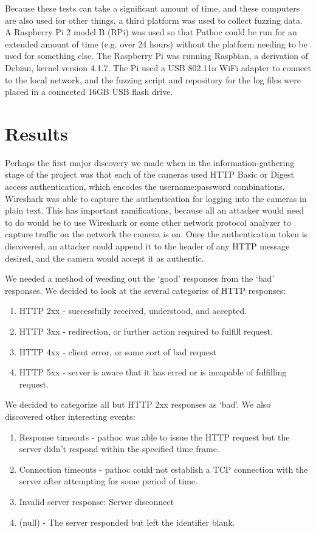 \documentclass[letterpaper,twocolumn,10pt]{article}
\begin{document}
Because these tests can take a significant amount of time, and these computers are also used for other things, a third platform was used to collect fuzzing data. A Raspberry Pi 2 model B (RPi) was used so that Pathoc could be run for an extended amount of time (e.g. over 24 hours) without the platform needing to be used for something else. The Raspberry Pi was running Raspbian, a derivation of Debian, kernel version 4.1.7. The Pi used a USB 802.11n WiFi adapter to connect to the local network, and the fuzzing script and repository for the log files were placed in a connected 16GB USB flash drive.


\section{Results}

Perhaps the first major discovery we made when in the information-gathering stage of the project was that each of the cameras used HTTP Basic or Digest access authentication, which encodes the username:password combinations. Wireshark was able to capture the authentication for logging into the cameras in plain text. This has important ramifications, because all an attacker would need to do would be to use Wireshark or some other network protocol analyzer to capture traffic on the network the camera is on. Once the authentication token is discovered, an attacker could append it to the header of any HTTP message desired, and the camera would accept it as authentic. 

We needed a method of weeding out the `good' responses from the `bad' responses. We decided to look at the several categories of HTTP responses: 
\begin{enumerate}
\item HTTP 2xx - successfully received, understood, and accepted.
\item HTTP 3xx - redirection, or further action required to fulfill request.
\item HTTP 4xx - client error, or some sort of bad request
\item HTTP 5xx - server is aware that it has erred or is incapable of fulfilling request.
\end{enumerate}
We decided to categorize all but HTTP 2xx responses as `bad'. We also discovered other interesting events:
\begin{enumerate}
	\item Response timeouts - pathoc was able to issue the HTTP request but the server didn't respond within the specified time frame.
	\item Connection timeouts - pathoc could not establish a TCP connection with the server after attempting for some period of time.
	\item Invalid server response: Server disconnect
	\item (null) - The server responded but left the identifier blank.
\end{enumerate}
\end{document}
